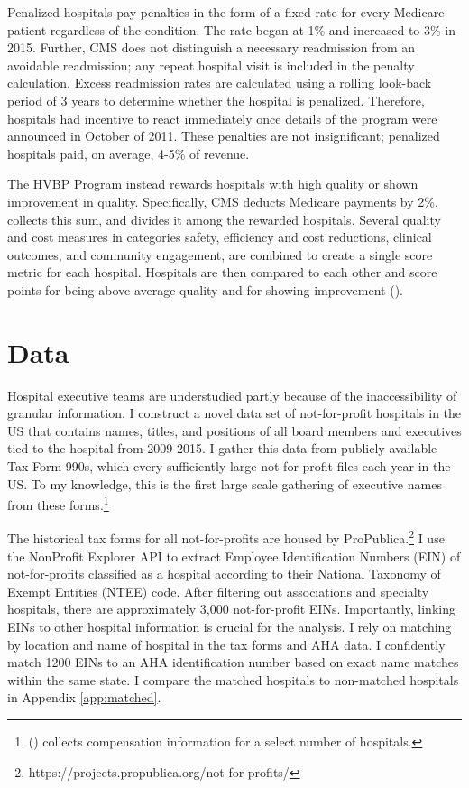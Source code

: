 \documentclass[12pt]{article}
\begin{document}
    Penalized hospitals pay penalties in the form of a fixed rate for every Medicare patient regardless of the condition. The rate began at 1\% and increased to 3\% in 2015. Further, CMS does not distinguish a necessary readmission from an avoidable readmission; any repeat hospital visit is included in the penalty calculation. Excess readmission rates are calculated using a rolling look-back period of 3 years to determine whether the hospital is penalized. Therefore, hospitals had incentive to react immediately once details of the program were announced in October of 2011. These penalties are not insignificant; penalized hospitals paid, on average, 4-5\% of revenue. 

    The HVBP Program instead rewards hospitals with high quality or shown improvement in quality. Specifically, CMS deducts Medicare payments by 2\%, collects this sum, and divides it among the rewarded hospitals. Several quality and cost measures in categories safety, efficiency and cost reductions, clinical outcomes, and community engagement, are combined to create a single score metric for each hospital. Hospitals are then compared to each other and score points for being above average quality and for showing improvement (\cite{CMS_2023}). 

    

	\section{Data}\label{sec:data}

    Hospital executive teams are understudied partly because of the inaccessibility of granular information. I construct a novel data set of not-for-profit hospitals in the US that contains names, titles, and positions of all board members and executives tied to the hospital from 2009-2015. I gather this data from publicly available Tax Form 990s, which every sufficiently large not-for-profit files each year in the US. To my knowledge, this is the first large scale gathering of executive names from these forms.\footnote{\citeauthor{brickley2010board} (\citeyear{brickley2010board}) collects compensation information for a select number of hospitals.} 

    The historical tax forms for all not-for-profits are housed by ProPublica.\footnote{https://projects.propublica.org/not-for-profits/} I use the NonProfit Explorer API to extract Employee Identification Numbers (EIN) of not-for-profits classified as a hospital according to their National Taxonomy of Exempt Entities (NTEE) code. After filtering out associations and specialty hospitals, there are approximately 3,000 not-for-profit EINs. Importantly, linking EINs to other hospital information is crucial for the analysis. I rely on matching by location and name of hospital in the tax forms and AHA data. I confidently match 1200 EINs to an AHA identification number based on exact name matches within the same state. I compare the matched hospitals to non-matched hospitals in Appendix \ref{app:matched}.
    
\end{document}
